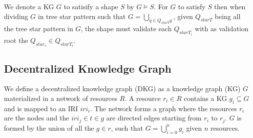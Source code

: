 We denote a KG $G$ to satisify a shape $S$ by $G \models S$.
For $G$ to satisfy $S$ then when dividing $G$ in tree star pattern such that $G = \bigcup_{q \in Q_{starT} q} $, given 
$Q_{starT}$ being all the tree star pattern in $G$,
the shape must validate each $Q_{starT_i}$ with as validation root the $Q_{star_s} \in Q_{starT_i}$.

\subsection{Decentralized Knowledge Graph}
We define a decentralized knowledge graph (DKG) as a knowledge graph (KG) $G$ materialized in a network of resources $R$.
A resource $r_i \in R$ contains a KG $g_i \subseteq G$ and is mapped to an IRI $iri_i$.
The network forms a graph where the resources $r_i$ are the nodes and the $iri_j \in t \in g$ are directed edges starting from $r_i$ to $r_j$.
$G$ is formed by the union of all the $g \in r$, such that $G = \bigcup_{i=0}^{n}g_i$ given $n$ resources.